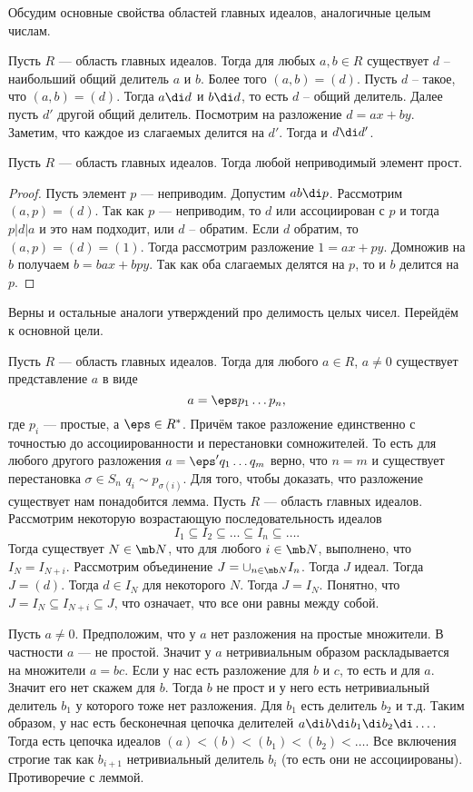 Обсудим основные свойства областей главных идеалов, аналогичные целым числам.

  Пусть $R$ --- область главных идеалов. Тогда для любых $a,b \in R$ существует $d$ -- наибольший общий делитель $a$ и $b$. Более того $(a,b)=(d)$.
\elm
\proof Пусть $d$ -- такое, что $(a,b)=(d)$. Тогда $a\di d$ и $b\di d$, то есть $d$ -- общий делитель. Далее пусть $d'$ другой общий делитель. Посмотрим на разложение $d=ax+by$. Заметим, что каждое из слагаемых делится на $d'$. Тогда и $d\di d'$. 
\endproof

\lm[Простой=неприводимый в ОГИ] Пусть $R$ --- область главных идеалов. Тогда любой неприводимый элемент прост. 
\begin{proof} Пусть элемент $p$ --- неприводим. Допустим $ab\di p$. Рассмотрим $(a,p)=(d)$. Так как $p$ --- неприводим, то $d$ или ассоциирован с $p$ и тогда $p|d|a$ и это нам подходит, или $d $ -- обратим. Если $d$ обратим, то $(a,p)=(d)=(1)$. Тогда рассмотрим разложение $1 = ax  + py$. Домножив на $b$ получаем $b = bax+bpy$. Так как оба слагаемых делятся на $p$, то и $b$ делится на $p$.
\end{proof}
\elm


Верны и остальные аналоги утверждений про делимость целых чисел. Перейдём к основной цели.



 Пусть $R$ --- область главных идеалов. Тогда для любого $a\in R$, $a\neq 0$ существует представление $a$ в виде 
$$ a=\eps p_1\dots p_n,$$
где $p_i$ --- простые, а $\eps \in R^*$. Причём такое разложение единственно с точностью до ассоциированности и перестановки сомножителей. То есть для любого другого разложения $a=\eps' q_1\dots q_m$ верно, что $n=m$ и существует перестановка $\sigma \in S_n$ $q_i\sim p_{\sigma(i)}$.
\ethrm Для того, чтобы доказать, что разложение существует нам понадобится лемма.
\lm Пусть $R$ --- область главных идеалов. Рассмотрим некоторую возрастающую последовательность идеалов
$$I_1\subseteq I_2\subseteq \dots \subseteq I_n\subseteq \dots.$$
Тогда существует $N\in \mb N$, что для любого $i\in \mb N$, выполнено, что $I_{N}=I_{N+i}$.
\elm
{} Рассмотрим объединение $J=\cup_{n\in \mb N} I_n$. Тогда $J$ идеал. Тогда $J=(d)$. Тогда $d\in I_N$ для некоторого $N$. Тогда $J=I_N$. Понятно, что $J=I_N\subseteq I_{N+i}\subseteq J$, что означает, что все они равны между собой.
\endproof

\proof[Существование] Пусть $a\neq 0$. Предположим, что у $a$ нет разложения на простые множители. В частности $a$ --- не простой. Значит у $a$ нетривиальным образом раскладывается на множители $a=bc$. Если у нас есть разложение для $b$ и $c$, то есть и для $a$. Значит его нет скажем для $b$. Тогда $b$ не прост и у него есть нетривиальный делитель $b_1$ у которого тоже нет разложения. Для $b_1$ есть делитель $b_2$ и т.д. Таким образом, у нас есть бесконечная цепочка делителей $a \di b \di b_1 \di b_2 \di \dots$. Тогда есть цепочка идеалов $(a)<(b)<(b_1)<(b_2)<\dots$. Все включения строгие так как $b_{i+1}$ нетривиальный делитель $b_i$ (то есть они не ассоциированы). Противоречие с леммой.

